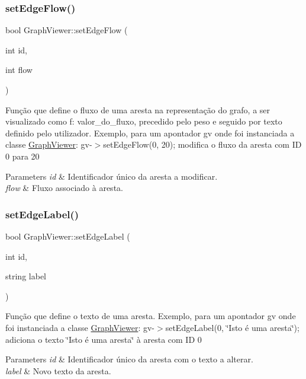 \subsubsection{\texorpdfstring{set\+Edge\+Flow()}{setEdgeFlow()}}
{\footnotesize\ttfamily bool Graph\+Viewer\+::set\+Edge\+Flow (\begin{DoxyParamCaption}\item[{int}]{id,  }\item[{int}]{flow }\end{DoxyParamCaption})}

Função que define o fluxo de uma aresta na representação do grafo, a ser visualizado como f\+: valor\+\_\+do\+\_\+fluxo, precedido pelo peso e seguido por texto definido pelo utilizador. Exemplo, para um apontador gv onde foi instanciada a classe \hyperlink{class_graph_viewer}{Graph\+Viewer}\+: gv-\/$>$set\+Edge\+Flow(0, 20); modifica o fluxo da aresta com ID 0 para 20


\begin{DoxyParams}{Parameters}
{\em id} & Identificador único da aresta a modificar. \\
\hline
{\em flow} & Fluxo associado à aresta. \\
\hline
\end{DoxyParams}
\hypertarget{class_graph_viewer_a447cca0064e785654c2105602c2961ca}{}\label{class_graph_viewer_a447cca0064e785654c2105602c2961ca} 
\subsubsection{\texorpdfstring{set\+Edge\+Label()}{setEdgeLabel()}}
{\footnotesize\ttfamily bool Graph\+Viewer\+::set\+Edge\+Label (\begin{DoxyParamCaption}\item[{int}]{id,  }\item[{string}]{label }\end{DoxyParamCaption})}

Função que define o texto de uma aresta. Exemplo, para um apontador gv onde foi instanciada a classe \hyperlink{class_graph_viewer}{Graph\+Viewer}\+: gv-\/$>$set\+Edge\+Label(0, \char`\"{}\+Isto é uma aresta\char`\"{}); adiciona o texto \char`\"{}\+Isto é uma aresta\char`\"{} à aresta com ID 0


\begin{DoxyParams}{Parameters}
{\em id} & Identificador único da aresta com o texto a alterar. \\
\hline
{\em label} & Novo texto da aresta. \\
\hline
\end{DoxyParams}
\hypertarget{class_graph_viewer_a07f598272fe3515455eab13be749604a}{}\label{class_graph_viewer_a07f598272fe3515455eab13be749604a} 
